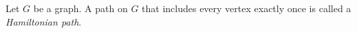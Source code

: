 \documentclass{article}
\begin{document}
Let $G$ be a graph. A path on $G$ that includes every vertex exactly once is called a \emph{Hamiltonian path}.
\end{document}
